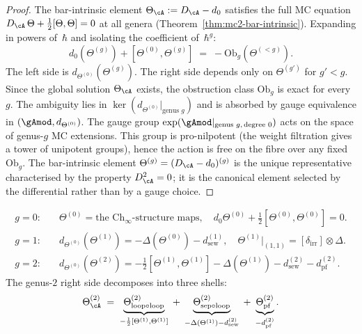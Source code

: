 \begin{proof}
The bar-intrinsic element $\Theta_\cA := D_\cA - d_0$ satisfies
the full MC equation $D_\cA\,\Theta + \frac{1}{2}[\Theta,\Theta] = 0$
at all genera (Theorem~\ref{thm:mc2-bar-intrinsic}).
Expanding in powers of~$\hbar$ and isolating the coefficient
of~$\hbar^g$:
\[
d_0(\Theta^{(g)}) + [\Theta^{(0)}, \Theta^{(g)}]
\;=\; -\mathrm{Ob}_g(\Theta^{(<g)}).
\]
The left side is $d_{\Theta^{(0)}}(\Theta^{(g)})$.
The right side depends only on $\Theta^{(g')}$ for $g' < g$.
Since the global solution $\Theta_\cA$ exists, the obstruction
class $\mathrm{Ob}_g$ is exact for every~$g$.
The ambiguity lies in $\ker(d_{\Theta^{(0)}}|_{\text{genus }g})$
and is absorbed by gauge equivalence in
$(\gAmod, d_{\Theta^{(0)}})$.
The gauge group $\exp(\gAmod|_{\text{genus }g,\,\text{degree }0})$
acts on the space of genus-$g$ MC extensions.  This group is
pro-nilpotent (the weight filtration gives a tower of unipotent
groups), hence the action is free on the fibre over any fixed
$\mathrm{Ob}_g$.  The bar-intrinsic element
$\Theta^{(g)} = (D_\cA - d_0)^{(g)}$ is the unique representative
characterised by the property $D_\cA^2 = 0$; it is the canonical
element selected by the differential rather than by a gauge choice.
\end{proof}

\begin{corollary}
\label{cor:genus-base-cases}
\begin{align*}
g = 0{:}&\quad
\Theta^{(0)} = \text{the $\mathrm{Ch}_\infty$-structure maps},
\quad d_0\Theta^{(0)} + \tfrac{1}{2}[\Theta^{(0)},\Theta^{(0)}] = 0.
\\[4pt]
g = 1{:}&\quad
d_{\Theta^{(0)}}(\Theta^{(1)})
= -\Delta(\Theta^{(0)}) - d_{\mathrm{sew}}^{(1)},
\quad
\Theta^{(1)}|_{(1,1)}
= [\delta_{\mathrm{irr}}]\otimes\Delta.
\\[4pt]
g = 2{:}&\quad
d_{\Theta^{(0)}}(\Theta^{(2)})
= -\tfrac{1}{2}[\Theta^{(1)},\Theta^{(1)}]
  - \Delta(\Theta^{(1)})
  - d_{\mathrm{sew}}^{(2)}
  - d_{\mathrm{pf}}^{(2)}.
\end{align*}
The genus-$2$ right side decomposes into three shells:
\[
\Theta_\cA^{(2)}
\;=\;
\underbrace{\Theta_{\mathrm{loop}\circ\mathrm{loop}}^{(2)}}_
  {-\frac{1}{2}[\Theta^{(1)},\Theta^{(1)}]}
\;+\;
\underbrace{\Theta_{\mathrm{sep}\circ\mathrm{loop}}^{(2)}}_
  {-\Delta(\Theta^{(1)}) - d_{\mathrm{sew}}^{(2)}}
\;+\;
\underbrace{\Theta_{\mathrm{pf}}^{(2)}}_
  {-d_{\mathrm{pf}}^{(2)}}.
\]
\end{corollary}

